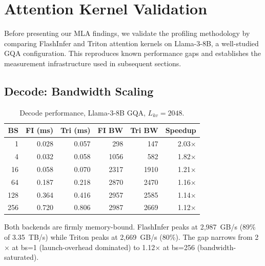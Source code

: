 \documentclass[10pt,twocolumn]{article}
\begin{document}
\section{Attention Kernel Validation}
\label{sec:validation}

Before presenting our MLA findings, we validate the profiling methodology by comparing FlashInfer and Triton attention kernels on Llama-3-8B, a well-studied GQA configuration.  This reproduces known performance gaps and establishes the measurement infrastructure used in subsequent sections.

\subsection{Decode: Bandwidth Scaling}
\label{sec:decode}

\begin{table}[h]
\centering
\small
\caption{Decode performance, Llama-3-8B GQA, $L_{kv}=2048$.}
\label{tab:decode_bs}
\begin{tabular}{@{}rrrrrr@{}}
\toprule
BS & FI (ms) & Tri (ms) & FI BW & Tri BW & Speedup \\
\midrule
  1 & 0.028 & 0.057 &  298 &  147 & 2.03$\times$ \\
  4 & 0.032 & 0.058 & 1056 &  582 & 1.82$\times$ \\
 16 & 0.058 & 0.070 & 2317 & 1910 & 1.21$\times$ \\
 64 & 0.187 & 0.218 & 2870 & 2470 & 1.16$\times$ \\
128 & 0.364 & 0.416 & 2957 & 2585 & 1.14$\times$ \\
256 & 0.720 & 0.806 & 2987 & 2669 & 1.12$\times$ \\
\bottomrule
\end{tabular}
\end{table}

Both backends are firmly memory-bound.  FlashInfer peaks at 2,987~GB/s (89\% of 3.35~TB/s) while Triton peaks at 2,669~GB/s (80\%).  The gap narrows from 2$\times$ at bs=1 (launch-overhead dominated) to 1.12$\times$ at bs=256 (bandwidth-saturated).
\end{document}
